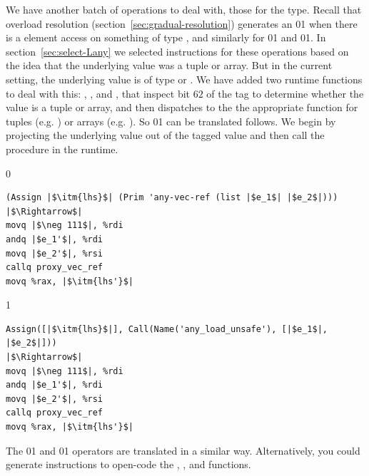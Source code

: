 \documentclass[7x10]{TimesAPriori_MIT}%
\def\racketEd{0}
\def\pythonEd{1}
\def\edition{0}
\newcommand{\racket}[1]{{\if\edition\racketEd{#1}\fi}}
\newcommand{\python}[1]{{\if\edition\pythonEd #1\fi}}
\numberwithin{theorem}{chapter}
\numberwithin{definition}{chapter}
\numberwithin{equation}{chapter}
\begin{document}
We have another batch of operations to deal with, those for the
\CANYTY{} type. Recall that overload resolution
(section~\ref{sec:gradual-resolution}) generates an
\racket{}\python{} when
there is a element access on something of type \CANYTY{}, and
similarly for
\racket{}\python{} and
\racket{}\python{}. In
section~\ref{sec:select-Lany} we selected instructions for these
operations based on the idea that the underlying value was a tuple or
array. But in the current setting, the underlying value is of type
\PTUPLETYNAME{} or \PARRAYTYNAME{}.  We have added two runtime
functions to deal with this: ,
, and
, that inspect bit $62$ of the tag
to determine whether the value is a tuple or array, and then
dispatches to the the appropriate function for
tuples (e.g. ) or arrays
(e.g. ).
%
So \racket{}\python{}
can be translated follows.
We begin by projecting the underlying value out of the tagged value and
then call the  procedure in the runtime.
{\if\edition\racketEd
\begin{lstlisting}
(Assign |$\itm{lhs}$| (Prim 'any-vec-ref (list |$e_1$| |$e_2$|)))
|$\Rightarrow$|
movq |$\neg 111$|, %rdi
andq |$e_1'$|, %rdi
movq |$e_2'$|, %rsi
callq proxy_vec_ref
movq %rax, |$\itm{lhs'}$|
\end{lstlisting}
\fi}
{\if\edition\pythonEd
\begin{lstlisting}
Assign([|$\itm{lhs}$|], Call(Name('any_load_unsafe'), [|$e_1$|, |$e_2$|]))
|$\Rightarrow$|
movq |$\neg 111$|, %rdi
andq |$e_1'$|, %rdi
movq |$e_2'$|, %rsi
callq proxy_vec_ref
movq %rax, |$\itm{lhs'}$|
\end{lstlisting}
\fi}
\noindent The \racket{}\python{}
and \racket{}\python{} operators 
are translated in a similar way. Alternatively, you could generate
instructions to open-code
the , ,
and  functions.
\end{document}
